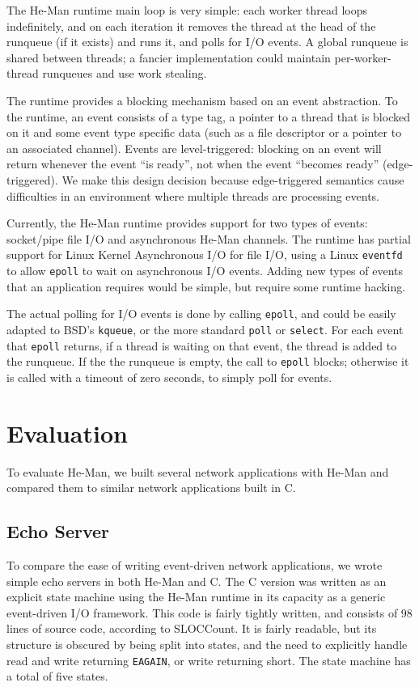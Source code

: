 \documentclass[preprint]{sigplanconf}
\renewcommand{\t}{\texttt}
\begin{document}
The He-Man runtime main loop is very simple: each worker thread
loops indefinitely, and on each iteration it removes the thread at the
head of the runqueue (if it exists) and runs it, and polls for I/O
events. A global runqueue is shared between threads; a fancier 
implementation could maintain per-worker-thread runqueues and use
work stealing.

The runtime provides a blocking mechanism based on an event
abstraction. To the runtime, an event consists of a type tag, a
pointer to a thread that is blocked on it and some event type specific
data (such as a file descriptor or a pointer to an associated
channel). Events are level-triggered: blocking on an event will return
whenever the event ``is ready'', not when the event ``becomes ready''
(edge-triggered). We make this design decision because edge-triggered semantics
cause difficulties in an environment where multiple threads are processing
events.

Currently, the He-Man runtime provides support for two types of
events: socket/pipe file I/O and asynchronous He-Man channels.  The
runtime has partial support for Linux Kernel Asynchronous I/O for file
I/O, using a Linux \t{eventfd} to allow \t{epoll} to wait on asynchronous I/O
events. Adding new types of events that an application requires would
be simple, but require some runtime hacking.

The actual polling for I/O events is done by calling \t{epoll}, and could be
easily adapted to BSD's \t{kqueue}, or the more standard \t{poll} or \t{select}.
For each event that \t{epoll} returns, if a thread is waiting on that event, the
thread is added to the runqueue. If the the runqueue is empty, the call to
\t{epoll} blocks; otherwise it is called with a timeout of zero seconds, to
simply poll for events.

\section{Evaluation}\label{sec:evaluation}

To evaluate He-Man, we built several network applications with He-Man
and compared them to similar network applications built in C.

\subsection{Echo Server}

To compare the ease of writing event-driven network applications, we wrote
simple echo servers in both He-Man and C. The C version was written as an
explicit state machine using the He-Man runtime in its capacity as a generic
event-driven I/O framework.  This code is fairly tightly written, and consists
of 98 lines of source code, according to SLOCCount.  It is fairly readable, but
its structure is obscured by being split into states, and the need to explicitly
handle read and write returning \t{EAGAIN}, or write returning short. The state
machine has a total of five states.
\end{document}
